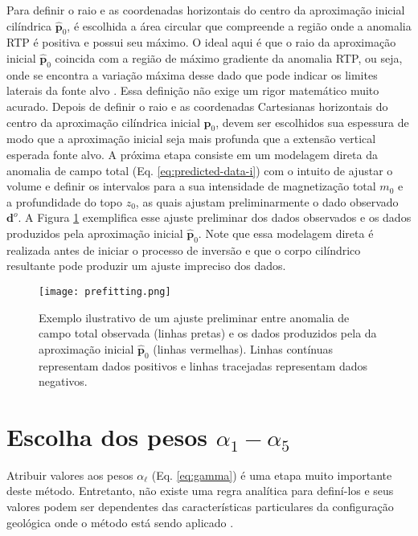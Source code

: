 Para definir o raio e as coordenadas horizontais do centro da aproximação inicial cilíndrica $ \hat{\mathbf{p}}_0 $, é escolhida a área circular que compreende a região onde a anomalia RTP é positiva e possui seu máximo.
O ideal aqui é que o raio da aproximação inicial $ \hat{\mathbf{p}}_0 $ coincida com a região de máximo gradiente da anomalia RTP, ou seja, onde se encontra a variação máxima desse dado que pode indicar os limites laterais da fonte alvo \citep{baranov1957}.
Essa definição não exige um rigor matemático muito acurado.
Depois de definir o raio e as coordenadas Cartesianas horizontais do centro da aproximação cilíndrica inicial $ \hat{\mathbf{p}}_0 $, devem ser escolhidos sua espessura de modo que a aproximação inicial seja mais profunda que a extensão vertical esperada fonte alvo.
A próxima etapa consiste em um modelagem direta da anomalia de campo total (Eq. \ref{eq:predicted-data-i}) com o intuito de ajustar o volume e definir os intervalos para a sua intensidade de magnetização total $m_{0}$ e a profundidade do topo $z_{0}$, as quais ajustam preliminarmente o dado observado $ \mathbf{d}^o $.
A Figura \ref{fig:prefit} exemplifica esse ajuste preliminar dos dados observados e os dados produzidos pela aproximação inicial $ \hat{\mathbf{p}}_0 $.
Note que essa modelagem direta é realizada antes de iniciar o processo de inversão e 
que o corpo cilíndrico resultante pode produzir um ajuste impreciso dos dados.

\begin{figure}[!htb]
	\centering
	\texttt{[image: prefitting.png]}
	\caption{Exemplo ilustrativo de um ajuste preliminar entre anomalia de campo total observada (linhas pretas) e os dados produzidos pela da aproximação inicial $ \hat{\mathbf{p}}_0 $ (linhas vermelhas). Linhas contínuas representam dados positivos e linhas tracejadas representam dados negativos.}
	\label{fig:prefit}
\end{figure}

\section{Escolha dos pesos $\alpha_{1}-\alpha_{5}$}

Atribuir valores aos pesos $ \alpha_{\ell} $ (Eq. \ref{eq:gamma}) é uma etapa muito importante deste método.
Entretanto, não existe uma regra analítica para definí-los e seus valores podem ser dependentes das características particulares da configuração geológica onde o método está sendo aplicado \cite[]{silva-2001}.

